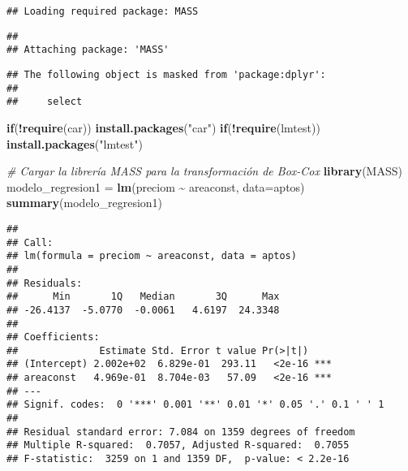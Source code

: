 \documentclass[
]{article}
\newenvironment{Shaded}{\begin{snugshade}}{\end{snugshade}}
\newcommand{\AttributeTok}[1]{\textcolor[rgb]{0.13,0.29,0.53}{#1}}
\newcommand{\CommentTok}[1]{\textcolor[rgb]{0.56,0.35,0.01}{\textit{#1}}}
\newcommand{\ControlFlowTok}[1]{\textcolor[rgb]{0.13,0.29,0.53}{\textbf{#1}}}
\newcommand{\FunctionTok}[1]{\textcolor[rgb]{0.13,0.29,0.53}{\textbf{#1}}}
\newcommand{\NormalTok}[1]{#1}
\newcommand{\OtherTok}[1]{\textcolor[rgb]{0.56,0.35,0.01}{#1}}
\newcommand{\SpecialCharTok}[1]{\textcolor[rgb]{0.81,0.36,0.00}{\textbf{#1}}}
\newcommand{\StringTok}[1]{\textcolor[rgb]{0.31,0.60,0.02}{#1}}
\begin{document}
\begin{verbatim}
## Loading required package: MASS
\end{verbatim}

\begin{verbatim}
## 
## Attaching package: 'MASS'
\end{verbatim}

\begin{verbatim}
## The following object is masked from 'package:dplyr':
## 
##     select
\end{verbatim}

\begin{Shaded}
\begin{Highlighting}[]
\ControlFlowTok{if}\NormalTok{(}\SpecialCharTok{!}\FunctionTok{require}\NormalTok{(car)) }\FunctionTok{install.packages}\NormalTok{(}\StringTok{"car"}\NormalTok{)}
\ControlFlowTok{if}\NormalTok{(}\SpecialCharTok{!}\FunctionTok{require}\NormalTok{(lmtest)) }\FunctionTok{install.packages}\NormalTok{(}\StringTok{"lmtest"}\NormalTok{)}

\CommentTok{\# Cargar la librería MASS para la transformación de Box{-}Cox}
\FunctionTok{library}\NormalTok{(MASS)}
\NormalTok{modelo\_regresion1 }\OtherTok{=} \FunctionTok{lm}\NormalTok{(preciom }\SpecialCharTok{\textasciitilde{}}\NormalTok{ areaconst, }\AttributeTok{data=}\NormalTok{aptos)}
\FunctionTok{summary}\NormalTok{(modelo\_regresion1)}
\end{Highlighting}
\end{Shaded}

\begin{verbatim}
## 
## Call:
## lm(formula = preciom ~ areaconst, data = aptos)
## 
## Residuals:
##      Min       1Q   Median       3Q      Max 
## -26.4137  -5.0770  -0.0061   4.6197  24.3348 
## 
## Coefficients:
##              Estimate Std. Error t value Pr(>|t|)    
## (Intercept) 2.002e+02  6.829e-01  293.11   <2e-16 ***
## areaconst   4.969e-01  8.704e-03   57.09   <2e-16 ***
## ---
## Signif. codes:  0 '***' 0.001 '**' 0.01 '*' 0.05 '.' 0.1 ' ' 1
## 
## Residual standard error: 7.084 on 1359 degrees of freedom
## Multiple R-squared:  0.7057, Adjusted R-squared:  0.7055 
## F-statistic:  3259 on 1 and 1359 DF,  p-value: < 2.2e-16
\end{verbatim}
\end{document}
